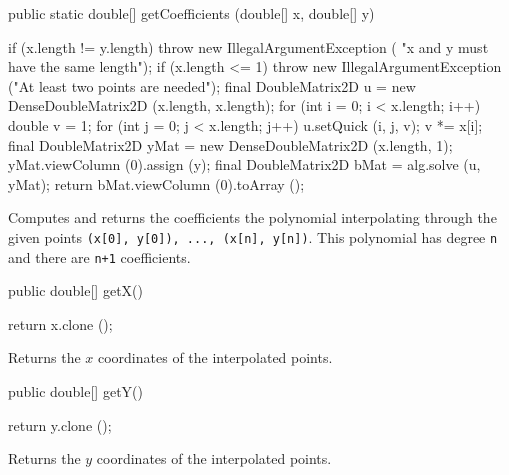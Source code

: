 \begin{code}

   public static double[] getCoefficients (double[] x, double[] y)\begin{hide} {
      if (x.length != y.length)
         throw new IllegalArgumentException (
               "x and y must have the same length");
      if (x.length <= 1)
         throw new IllegalArgumentException ("At least two points are needed");
      final DoubleMatrix2D u = new DenseDoubleMatrix2D (x.length, x.length);
      for (int i = 0; i < x.length; i++) {
         double v = 1;
         for (int j = 0; j < x.length; j++) {
            u.setQuick (i, j, v);
            v *= x[i];
         }
      }
      final DoubleMatrix2D yMat = new DenseDoubleMatrix2D (x.length, 1);
      yMat.viewColumn (0).assign (y);
      final DoubleMatrix2D bMat = alg.solve (u, yMat);
      return bMat.viewColumn (0).toArray ();
   }\end{hide}
\end{code}
\begin{tabb} Computes and returns the coefficients the polynomial interpolating
 through the given points \texttt{(x[0], y[0]), ..., (x[n], y[n])}. 
 This polynomial has degree \texttt{n} and there are \texttt{n+1} coefficients.
\end{tabb}
\begin{htmlonly}
\end{htmlonly}
\begin{code}

   public double[] getX()\begin{hide} {
      return x.clone ();
   }\end{hide}
\end{code}
\begin{tabb}   Returns the $x$ coordinates of the interpolated points.
\end{tabb}
\begin{htmlonly}
\end{htmlonly}
\begin{code}

   public double[] getY()\begin{hide} {
      return y.clone ();
   }\end{hide}
\end{code}
\begin{tabb}   Returns the $y$ coordinates of the interpolated points.
\end{tabb}
